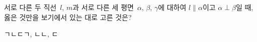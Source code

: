 서로 다른 두 직선~$l$, $m$과 서로 다른 세 평면~$\alpha$, $\beta$, $\gamma$에 대하여 $l\parallel\alpha$이고 $\alpha\perp\beta$일 때, 옳은 것만을 보기에서 있는 대로 고른 것은? 
\begin{choices32}{ㄱ}{ㄴ}{ㄷ}{ㄱ, ㄴ}{ㄴ, ㄷ}\end{choices32}
